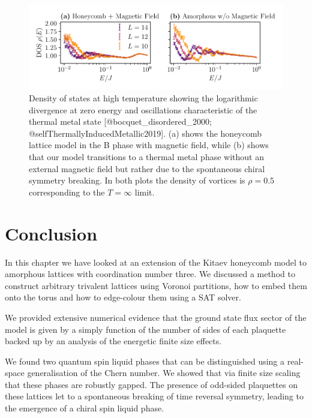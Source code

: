 \begin{figure}
\hypertarget{fig:DOS_oscillations}{%
\centering
\includegraphics[width=1\textwidth,height=\textheight]{figure_code/amk_chapter/results/DOS_oscillations/DOS_oscillations}
\caption[Distinctive Oscillations in the Density of States]{Density of states at high temperature showing the logarithmic
divergence at zero energy and oscillations characteristic of the thermal
metal state {[}@bocquet\_disordered\_2000;
@selfThermallyInducedMetallic2019{]}. (a) shows the honeycomb lattice
model in the B phase with magnetic field, while (b) shows that our model
transitions to a thermal metal phase without an external magnetic field
but rather due to the spontaneous chiral symmetry breaking. In both
plots the density of vortices is \(\rho = 0.5\) corresponding to the
\(T = \infty\) limit.}\label{fig:DOS_oscillations}
}
\end{figure}

\hypertarget{conclusion}{%
\section{Conclusion}\label{conclusion}}

In this chapter we have looked at an extension of the Kitaev honeycomb model to amorphous lattices with coordination number three. We discussed a method to construct arbitrary trivalent lattices using Voronoi partitions, how to embed them onto the torus and how to edge-colour them using a SAT solver.

We provided extensive numerical evidence that the ground state flux sector of the model is given by a simply function of the number of sides of each plaquette backed up by an analysis of the energetic finite size effects.

We found two quantum spin liquid phases that can be distinguished using a real-space generalisation of the Chern number. We showed that via finite size scaling that these phases are robustly gapped. The presence of odd-sided plaquettes on these lattices let to a spontaneous breaking of time reversal symmetry, leading to the emergence of a chiral spin liquid phase.

